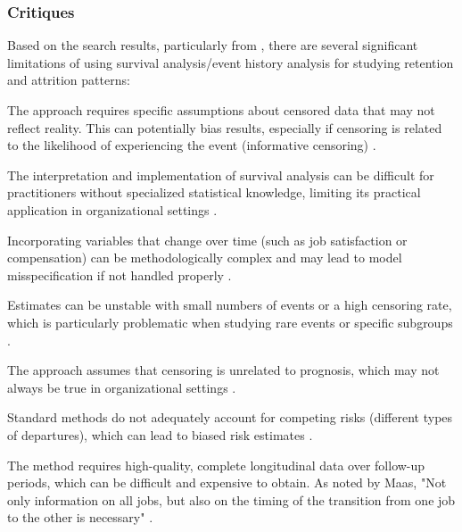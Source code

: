 \documentclass[../main.tex]{subfiles}
\begin{document}
\subsubsection{Critiques}

Based on the search results, particularly from \citep{limitations2016survival}, there are several significant limitations of using survival analysis/event history analysis for studying retention and attrition patterns:

The approach requires specific assumptions about censored data that may not reflect reality. This can potentially bias results, especially if censoring is related to the likelihood of experiencing the event (informative censoring) \citep{limitations2016survival}.

The interpretation and implementation of survival analysis can be difficult for practitioners without specialized statistical knowledge, limiting its practical application in organizational settings \citep{limitations2016survival}.

Incorporating variables that change over time (such as job satisfaction or compensation) can be methodologically complex and may lead to model misspecification if not handled properly \citep{limitations2016survival}.

Estimates can be unstable with small numbers of events or a high censoring rate, which is particularly problematic when studying rare events or specific subgroups \citep{limitations2016survival}.

The approach assumes that censoring is unrelated to prognosis, which may not always be true in organizational settings \citep{limitations2016survival}.

Standard methods do not adequately account for competing risks (different types of departures), which can lead to biased risk estimates \citep{limitations2016survival}.

The method requires high-quality, complete longitudinal data over follow-up periods, which can be difficult and expensive to obtain. As noted by Maas, "Not only information on all jobs, but also on the timing of the transition from one job to the other is necessary" \citep{maas2003use}.
\end{document}
